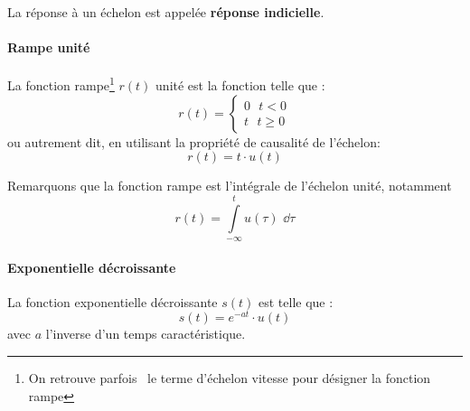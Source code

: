 La réponse à un échelon est appelée \textbf{réponse indicielle}.


\paragraph{Rampe unité}

La fonction rampe\footnote{On retrouve parfois~\cite{sueurautomatique} le terme 
d'échelon vitesse pour désigner la fonction rampe} $r(t)$ unité est la fonction telle que :
$$
r(t)=
\begin{cases}
	0\,\,\,\,t<0 \\
	t\,\,\,\,t\geq0 
\end{cases}
$$
ou autrement dit, en utilisant la propriété de causalité de l'échelon:
$$
r(t)=t\cdot u(t)
$$

\begin{figure}[!h]
\begin{center}
\end{center}
    \caption{\label{fig-rampe}}
\end{figure}
Remarquons que la fonction rampe est l'intégrale de l'échelon unité, notamment 
$$
r(t)=\int\limits_{-\infty}^{t} u(\tau)\,\,\dd{\tau}
$$

\paragraph{Exponentielle décroissante}
La fonction exponentielle décroissante $s(t)$ est telle que :
$$
s(t)=e^{-at}\cdot u(t)
$$  
avec $a$ l'inverse d'un temps caractéristique.

